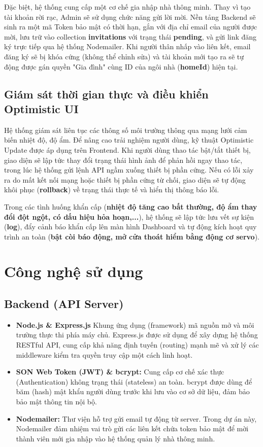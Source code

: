 \documentclass[a4paper,twoside]{article}
\begin{document}
Đặc biệt, hệ thống cung cấp một cơ chế gia nhập nhà thông minh. Thay vì tạo tài khoản rời rạc, Admin sẽ sử dụng chức năng gửi lời mời. Nền tảng Backend sẽ sinh ra một mã Token bảo mật có thời hạn, gắn với địa chỉ email của người được mời, lưu trữ vào collection \textbf{invitations} với trạng thái \textbf{pending}, và gửi link đăng ký trực tiếp qua hệ thống Nodemailer. Khi người thân nhấp vào liên kết, email đăng ký sẽ bị khóa cứng (không thể chỉnh sửa) và tài khoản mới tạo ra sẽ tự động được gán quyền "Gia đình" cùng ID của ngôi nhà (\textbf{homeId}) hiện tại.

\subsection{Giám sát thời gian thực và điều khiển Optimistic UI}
Hệ thống giám sát liên tục các thông số môi trường thông qua mạng lưới cảm biến nhiệt độ, độ ẩm. Để nâng cao trải nghiệm người dùng, kỹ thuật Optimistic Update được áp dụng trên Frontend. Khi người dùng thao tác bật/tắt thiết bị, giao diện sẽ lập tức thay đổi trạng thái hình ảnh để phản hồi ngay thao tác, trong lúc hệ thống gửi lệnh API ngầm xuống thiết bị phần cứng. Nếu có lỗi xảy ra do mất kết nối mạng hoặc thiết bị phần cứng từ chối, giao diện sẽ tự động khôi phục (\textbf{rollback}) về trạng thái thực tế và hiển thị thông báo lỗi.

Trong các tình huống khẩn cấp (\textbf{nhiệt độ tăng cao bất thường, độ ẩm thay đổi đột ngột, có dấu hiệu hỏa hoạn,...}), hệ thống sẽ lập tức lưu vết sự kiện (\textbf{log}), đẩy cảnh báo khẩn cấp lên màn hình Dashboard và tự động kích hoạt quy trình an toàn (\textbf{bật còi báo động, mở cửa thoát hiểm bằng động cơ servo}).

\section{Công nghệ sử dụng}
\subsection{Backend (API Server)}

\begin{itemize}
	\item \textbf{Node.js \& Express.js} Khung ứng dụng (framework) mã nguồn mở và môi trường thực thi phía máy chủ. Express.js được sử dụng để xây dựng hệ thống RESTful API, cung cấp khả năng định tuyến (routing) mạnh mẽ và xử lý các middleware kiểm tra quyền truy cập một cách linh hoạt.
	\item \textbf{SON Web Token (JWT) \& bcrypt:} Cung cấp cơ chế xác thực (Authentication) không trạng thái (stateless) an toàn. bcrypt được dùng để băm (hash) mật khẩu người dùng trước khi lưu vào cơ sở dữ liệu, đảm bảo bảo mật thông tin nội bộ.
	\item \textbf{Nodemailer:} Thư viện hỗ trợ gửi email tự động từ server. Trong dự án này, Nodemailer đảm nhiệm vai trò gửi các liên kết chứa token bảo mật để mời thành viên mới gia nhập vào hệ thống quản lý nhà thông minh.
\end{itemize}
\end{document}

